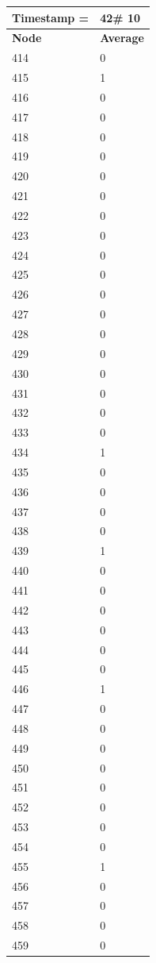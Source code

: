 \begin{tabular}{|l||l|}
\hline
\textbf{Timestamp =} & \textbf{42}\# 10\\\hline
	\textbf{Node} & \textbf{Average} \\ \hline
\hline
	414 & 0 \\ \hline
	415 & 1 \\ \hline
	416 & 0 \\ \hline
	417 & 0 \\ \hline
	418 & 0 \\ \hline
	419 & 0 \\ \hline
	420 & 0 \\ \hline
	421 & 0 \\ \hline
	422 & 0 \\ \hline
	423 & 0 \\ \hline
	424 & 0 \\ \hline
	425 & 0 \\ \hline
	426 & 0 \\ \hline
	427 & 0 \\ \hline
	428 & 0 \\ \hline
	429 & 0 \\ \hline
	430 & 0 \\ \hline
	431 & 0 \\ \hline
	432 & 0 \\ \hline
	433 & 0 \\ \hline
	434 & 1 \\ \hline
	435 & 0 \\ \hline
	436 & 0 \\ \hline
	437 & 0 \\ \hline
	438 & 0 \\ \hline
	439 & 1 \\ \hline
	440 & 0 \\ \hline
	441 & 0 \\ \hline
	442 & 0 \\ \hline
	443 & 0 \\ \hline
	444 & 0 \\ \hline
	445 & 0 \\ \hline
	446 & 1 \\ \hline
	447 & 0 \\ \hline
	448 & 0 \\ \hline
	449 & 0 \\ \hline
	450 & 0 \\ \hline
	451 & 0 \\ \hline
	452 & 0 \\ \hline
	453 & 0 \\ \hline
	454 & 0 \\ \hline
	455 & 1 \\ \hline
	456 & 0 \\ \hline
	457 & 0 \\ \hline
	458 & 0 \\ \hline
	459 & 0 \\ \hline
\end{tabular}
